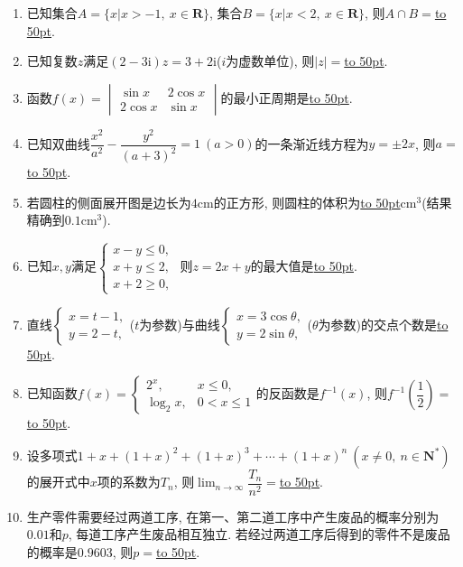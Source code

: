 \documentclass[10pt,a4paper]{article}
\newcommand{\blank}[1]{\underline{\hbox to #1pt{}}}
\begin{document}
\begin{enumerate}[1.]
\item 已知集合$A=\{x|x>-1, \ x\in \mathbf{R}\}$, 集合$B=\{x|x<2, \ x\in \mathbf{R}\}$, 则$A\cap B=$\blank{50}.
\item 已知复数$z$满足$(2-3\mathrm{i})z=3+2\mathrm{i}$($i$为虚数单位), 则$|z|=$\blank{50}.
\item 函数$f(x)=\begin{vmatrix} \sin x & 2\cos x \\ 2\cos x & \sin x\end{vmatrix}$的最小正周期是\blank{50}.
\item 已知双曲线$\dfrac{x^2}{a^2}-\dfrac{y^2}{(a+3)^2}=1 \ (a>0)$的一条渐近线方程为$y=\pm 2x$, 则$a=$\blank{50}.
\item 若圆柱的侧面展开图是边长为$4\text{cm}$的正方形, 则圆柱的体积为\blank{50}$\text{cm}^3$(结果精确到$0.1\text{cm}^3$).
\item 已知$x,y$满足$\begin{cases} x-y\le 0,\\ x+y\le 2, \\ x+2 \ge 0,\end{cases}$ 则$z=2x+y$的最大值是\blank{50}.
\item 直线$\begin{cases} x=t-1, \\ y=2-t,\end{cases}$($t$为参数)与曲线$\begin{cases} x=3\cos\theta, \\ y=2\sin\theta,\end{cases}$($\theta$为参数)的交点个数是\blank{50}.
\item 已知函数$f(x)=\begin{cases}2^x, & x\le 0, \\ \log_2 x, & 0<x\le 1\end{cases}$的反函数是$f^{-1}(x)$, 则$f^{-1}(\dfrac12)=$\blank{50}.
\item 设多项式$1+x+(1+x)^2+(1+x)^3+\cdots+(1+x)^n\ (x\ne 0, \ n\in \mathbf{N}^*)$的展开式中$x$项的系数为$T_n$, 则$\displaystyle\lim_{n\to \infty}\dfrac{T_n}{n^2}=$\blank{50}.
\item 生产零件需要经过两道工序, 在第一、第二道工序中产生废品的概率分别为$0.01$和$p$, 每道工序产生废品相互独立. 若经过两道工序后得到的零件不是废品的概率是$0.9603$, 则$p=$\blank{50}.



\end{enumerate}
\end{document}

